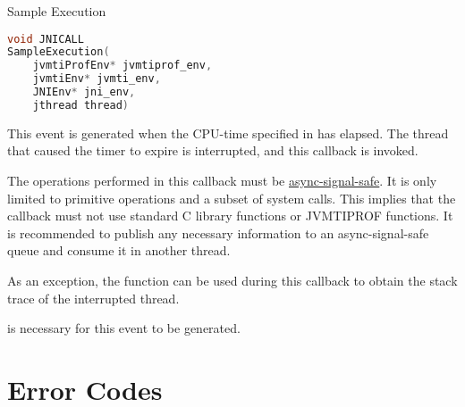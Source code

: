 \begin{apidef}{Sample Execution}
\begin{lstlisting}[language=C]
void JNICALL
SampleExecution(
    jvmtiProfEnv* jvmtiprof_env,
    jvmtiEnv* jvmti_env,
    JNIEnv* jni_env,
    jthread thread)
\end{lstlisting}

\begin{apidesc}
This event is generated when the CPU-time specified in  has elapsed. The thread that caused the timer to expire is interrupted, and this callback is invoked.

\medskip
The operations performed in this callback must be \href{https://man7.org/linux/man-pages/man7/signal-safety.7.html}{async-signal-safe}. It is only limited to primitive operations and a subset of system calls. This implies that the callback must not use standard C library functions or JVMTIPROF functions. It is recommended to publish any necessary information to an async-signal-safe queue and consume it in another thread.

\medskip
As an exception, the  function can be used during this callback to obtain the stack trace of the interrupted thread.
\end{apidesc}

\begin{apiphase}
\eventphaselive
\end{apiphase}

\begin{eventtype}
\end{eventtype}

\begin{apicap}
 is necessary for this event to be generated.
\end{apicap}

\begin{apiparam}
\end{apiparam}
\end{apidef}

\section{Error Codes} \label{api:ec}

